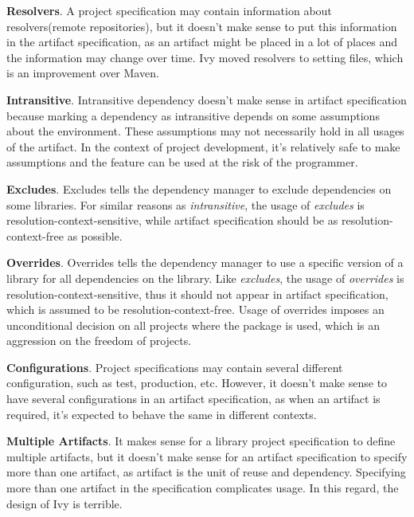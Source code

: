\textbf{Resolvers}. A project specification may contain information about resolvers(remote repositories), but it doesn't make sense to put this information in the artifact specification, as an artifact might be placed in a lot of places and the information may change over time. Ivy moved resolvers to setting files, which is an improvement over Maven.


\textbf{Intransitive}. Intransitive dependency doesn't make sense in artifact specification because marking a dependency as intransitive depends on some assumptions about the environment. These assumptions may not necessarily hold in all usages of the artifact. In the context of project development, it's relatively safe to make assumptions and the feature can be used at the risk of the programmer.

\textbf{Excludes}. Excludes tells the dependency manager to exclude dependencies on some libraries. For similar reasons as \emph{intransitive}, the usage of \emph{excludes} is resolution-context-sensitive, while artifact specification should be as resolution-context-free as possible.

\textbf{Overrides}. Overrides tells the dependency manager to use a specific version of a library for all dependencies on the library. Like \emph{excludes}, the usage of \emph{overrides} is resolution-context-sensitive, thus it should not appear in artifact specification, which is assumed to be resolution-context-free. Usage of overrides imposes an unconditional decision on all projects where the package is used, which is an aggression on the freedom of projects.

\textbf{Configurations}. Project specifications may contain several different configuration, such as test, production, etc. However, it doesn't make sense to have several configurations in an artifact specification, as when an artifact is required, it's expected to behave the same in different contexts.

\textbf{Multiple Artifacts}. It makes sense for a library project specification to define multiple artifacts, but it doesn't make sense for an artifact specification to specify more than one artifact, as artifact is the unit of reuse and dependency. Specifying more than one artifact in the specification complicates usage. In this regard, the design of Ivy is terrible.

